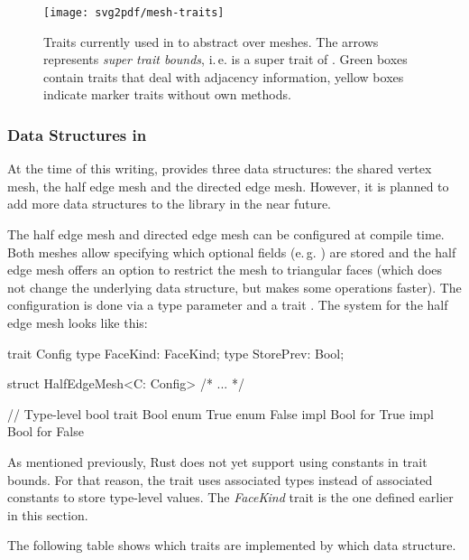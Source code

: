 \begin{figure}[th]
  \centering
  \texttt{[image: svg2pdf/mesh-traits]}
  \caption{
    Traits currently used in  to abstract over meshes.
    The arrows represents \emph{super trait bounds}, i.\,e.  is a super trait of .
    Green boxes contain traits that deal with adjacency information, yellow boxes indicate marker traits without own methods.
  }
  \label{fig:mesh-traits}
\end{figure}


\vfill
\subsubsection*{Data Structures in }

At the time of this writing,  provides three data structures:
the shared vertex mesh, the half edge mesh and the directed edge mesh.
However, it is planned to add more data structures to the library in the near future.

The half edge mesh and directed edge mesh can be configured at compile time.
Both meshes allow specifying which optional fields (e.\,g. ) are stored and the half edge mesh offers an option to restrict the mesh to triangular faces (which does not change the underlying data structure, but makes some operations faster).
The configuration is done via a type parameter and a trait .
The system for the half edge mesh looks like this:

\begin{rustcode}
trait Config {
    type FaceKind: FaceKind;
    type StorePrev: Bool;
}

struct HalfEdgeMesh<C: Config> { /* ... */ }

// Type-level bool
trait Bool {}
enum True {}
enum False {}
impl Bool for True {}
impl Bool for False {}
\end{rustcode}

As mentioned previously, Rust does not yet support using constants in trait bounds.
For that reason, the  trait uses associated types instead of associated constants to store type-level values.
The \emph{FaceKind} trait is the one defined earlier in this section.

\newpage
The following table shows which traits are implemented by which data structure.

